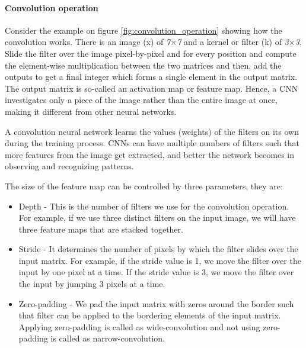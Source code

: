             \paragraph{Convolution operation} Consider the example on figure \ref{fig:convolution_operation} showing how the convolution works. 
            There is an image (x) of \textit{7$\times$7} and a kernel or filter (k) of \textit{3$\times$3}.
            Slide the filter over the image pixel-by-pixel and for every position and compute the element-wise multiplication between the two matrices and then, add the outputs to get a final integer which forms a single element in the output matrix. 
            The output matrix is so-called an activation map or feature map. 
            Hence, a CNN investigates only a piece of the image rather than the entire image at once, making it different from other neural networks. 

            A convolution neural network learns the values (weights) of the filters on its own during the training process. 
            CNNs can have multiple numbers of filters such that more features from the image get extracted, and better the network becomes in observing and recognizing patterns. 
            
            The size of the feature map can be controlled by three parameters, they are:
            \begin{itemize}
                \item Depth - This is the number of filters we use for the convolution operation. 
                For example, if we use three distinct filters on the input image, we will have three feature maps that are stacked together. 
                
                \item  Stride - It determines the number of pixels by which the filter slides over the input matrix. 
                For example, if the stride value is 1, we move the filter over the input by one pixel at a time. 
                If the stride value is 3, we move the filter over the input by jumping 3 pixels at a time.
                
                \item Zero-padding - We pad the input matrix with zeros around the border such that filter can be applied to the bordering elements of the input matrix. 
                Applying zero-padding is called as wide-convolution and not using zero-padding is called as narrow-convolution.
            \end{itemize}

